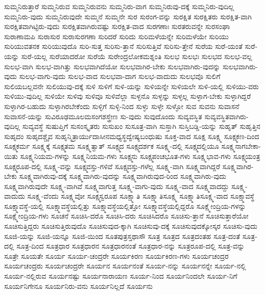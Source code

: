 {ಸುಮ್ಮನಿರುತ್ತಾರೆ
ಸುಮ್ಮನಿರುವ
ಸುಮ್ಮನಿರುವನು
ಸುಮ್ಮನಿರು-ವಾಗ
ಸುಮ್ಮನಿರುವು-ದಕ್ಕೆ
ಸುಮ್ಮನಿರು-ವುದಿಲ್ಲ
ಸುಮ್ಮನಿರು-ವುದು
ಸುಮ್ಮನಿರುವುದೇ
ಸುಮ್ಮನೆ
ಸುಮ್ಮನೇ
ಸುರ
ಸುರಂಗ-ವನ್ನು
ಸುರಕ್ಷಿತ
ಸುರಕ್ಷಿತರು
ಸುರಕ್ಷಿತ-ವಾಗಿ
ಸುರಕ್ಷಿತವಾಗಿಟ್ಟಿರು-ವುದು
ಸುರಕ್ಷಿತವಾಗಿರುವಷ್ಟು
ಸುರಕ್ಷಿತ-ವಾದ
ಸುರಗಣಾಃ
ಸುರತರುವನ್ನೇ
ಸುರಸಂಘಾ
ಸುರಾಣಾಮಪಿ
ಸುರಾಸುರ
ಸುರಾಸುರಗಣಾ
ಸುರಿದರೆ
ಸುರಿದು
ಸುರಿಮಳೆಯನ್ನೇ
ಸುರಿಮಳೆಯೇ
ಸುರಿಯು
ಸುರಿಯುವತನಕ
ಸುರಿಯುವುದೊ
ಸುರಿ-ಸುತ್ತ
ಸುರಿಸು-ತ್ತಾನೆ
ಸುರಿಸುತ್ತಿವೆ
ಸುರಿಸು-ತ್ತೇನೆ
ಸುರೆಯ
ಸುರೆ-ಯಂತೆ
ಸುರೆ-ಯನ್ನು
ಸುರೆ-ಯಲ್ಲ
ಸುರೆಯಾದರೋ
ಸುರೆಯೆ
ಸುರೇಂದ್ರಲೋಕಮಶ್ನಂತಿ
ಸುಲಭ
ಸುಲಭಃ
ಸುಲಭದ
ಸುಲಭ-ವಲ್ಲ
ಸುಲಭ-ವಾಗಿ
ಸುಲಭ-ವಾಗಿತ್ತು
ಸುಲಭವಾಗಿದೆಯೋ
ಸುಲಭವಾಗಿರ-ಬೇಕು
ಸುಲಭವಾಗಿರು-ವುದನ್ನು
ಸುಲಭವಾಗಿರು-ವುದು
ಸುಲಭ-ವಾಗು-ವುದು
ಸುಲಭ-ವಾದ
ಸುಲಭವಾ-ದಾಗ
ಸುಲಭ-ವಾದುದು
ಸುಲಭವೊ
ಸುಲಿಗೆ
ಸುಲಿಯಬಲ್ಲವನೇ
ಸುಲಿಯುವು-ದಕ್ಕೆ
ಸುಳಿ
ಸುಳಿಗೆ
ಸುಳಿ-ಯನ್ನು
ಸುಳಿಯನ್ನೇ
ಸುಳಿಯಲೇ
ಸುಳಿ-ಯಲ್ಲಿ
ಸುಳಿಯು-ವರು
ಸುಳಿಯು-ವುದಿಲ್ಲ
ಸುಳಿಯೇ
ಸುಳಿವು
ಸುಳಿವೂ
ಸುಳಿವೆಲ್ಲಾ
ಸುಳ್ಳನೊ
ಸುಳ್ಳನ್ನು
ಸುಳ್ಳಲ್ಲ
ಸುಳ್ಳಾಗ-ಬೇಕು
ಸುಳ್ಳಾಗಿದ್ದರೆ
ಸುಳ್ಳಾಗಿರ-ಬಹುದು
ಸುಳ್ಳಾಗಿರಬೇಕೆಂದು
ಸುಳ್ಳಿಗೆ
ಸುಳ್ಳಿ-ನಿಂದ
ಸುಳ್ಳು
ಸುಳ್ಳೇ
ಸುಳ್ಳೋ
ಸುವ
ಸುವನು
ಸುವಾಸನೆ
ಸುವಾಸನೆ-ಯನ್ನು
ಸುವಿರೂಢಮೂಲಮಸಂಗಶಸ್ತ್ರೇಣ
ಸು-ವುದು
ಸುವುದೊಂದು
ಸುವ್ಯವಸ್ಥಿತ
ಸುವ್ಯವಸ್ಥಿತವಾಗಿರು-ವುದಿಲ್ಲ
ಸುವ್ಯವಸ್ಥೆ
ಸುಷುಪ್ತಿಗೆ
ಸುಸಂಸ್ಕೃತರು
ಸುಸುಖಂ
ಸುಸೂತ್ರ-ವಾಗಿ
ಸುಸ್ತಾಗಿ
ಸುಸ್ತಿಬಡ್ಡಿ-ಯನ್ನು
ಸುಹೃತ್
ಸುಹೃತ್ತಿನ
ಸುಹೃದಂ
ಸುಹೃದಶ್ಚೈವ
ಸುಹೃನ್ಮಿತ್ರಾರ್ಯುದಾಸೀನಮಧ್ಯಸ್ಥದ್ವೇಷ್ಯಬಂಧುಷು
ಸೂಕ್ತ-ವಾದ
ಸೂಕ್ಷ
ಸೂಕ್ಷ್ಮ
ಸೂಕ್ಷ್ಮಕಣ-ದಿಂದ
ಸೂಕ್ಷ್ಮಕರ್ಮ
ಸೂಕ್ಷ್ಮಕ್ಕೆ
ಸೂಕ್ಷ್ಮತಮ
ಸೂಕ್ಷ್ಮತ್ವಾತ್
ಸೂಕ್ಷ್ಮದ
ಸೂಕ್ಷ್ಮದರ್ಶಕ
ಸೂಕ್ಷ್ಮ-ದಲ್ಲಿ
ಸೂಕ್ಷ್ಮದಲ್ಲಿಯೂ
ಸೂಕ್ಷ್ಮನಾಗಬೇಕಾ-ಯಿತು
ಸೂಕ್ಷ್ಮನಿಯಮ-ಗಳನ್ನು
ಸೂಕ್ಷ್ಮನಿಯಮ-ಗಳು
ಸೂಕ್ಷ್ಮನು
ಸೂಕ್ಷ್ಮಪಂಚಭೂತ-ಗಳು
ಸೂಕ್ಷ್ಮಭಾವ-ಗಳು
ಸೂಕ್ಷ್ಮಯಂತ್ರ
ಸೂಕ್ಷ್ಮರೂಪ-ದಲ್ಲಿ
ಸೂಕ್ಷ್ಮ-ವನ್ನು
ಸೂಕ್ಷ್ಮವಸ್ತು-ಗಳಿವೆ
ಸೂಕ್ಷ್ಮವಸ್ತು-ಗಳೆಲ್ಲ
ಸೂಕ್ಷ್ಮ-ವಾಗಿ
ಸೂಕ್ಷ್ಮವಾಗಿದ್ದರೆ
ಸೂಕ್ಷ್ಮವಾಗಿರ-ಬೇಕು
ಸೂಕ್ಷ್ಮವಾಗಿರುವು-ದಕ್ಕೆ
ಸೂಕ್ಷ್ಮವಾಗಿರು-ವುದನ್ನು
ಸೂಕ್ಷ್ಮವಾಗಿರುವುದ-ರಿಂದ
ಸೂಕ್ಷ್ಮವಾಗಿರು-ವುದು
ಸೂಕ್ಷ್ಮವಾಗಿರುವುದೇ
ಸೂಕ್ಷ್ಮ-ವಾಗಿವೆ
ಸೂಕ್ಷ್ಮವಾಗುತ್ತ
ಸೂಕ್ಷ್ಮ-ವಾಗು-ವುದು
ಸೂಕ್ಷ್ಮ-ವಾದ
ಸೂಕ್ಷ್ಮವಾದದ್ದು
ಸೂಕ್ಷ್ಮ-ವಾದುದು
ಸೂಕ್ಷ್ಮ-ವೆಂದು
ಸೂಕ್ಷ್ಮವೋ
ಸೂಕ್ಷ್ಮಸ್ವರೂಪ
ಸೂಕ್ಷ್ಮಾತಿ
ಸೂಕ್ಷ್ಮಾತಿಸೂಕ್ಷ್ಮ
ಸೂಕ್ಷ್ಮಾತಿಸೂಕ್ಷ್ಮ-ವಾದ
ಸೂಕ್ಷ್ಮಾವಸ್ಥೆ
ಸೂಕ್ಷ್ಮಾವಸ್ಥೆ-ಯಲ್ಲಿ
ಸೂಕ್ಷ್ಮಾವಸ್ಥೆಯಲ್ಲಿತ್ತು
ಸೂಕ್ಷ್ಮಾವಸ್ಥೆಯಲ್ಲಿತ್ತೋ
ಸೂಕ್ಷ್ಮಾವಸ್ಥೆಯಲ್ಲಿದ್ದರೊ
ಸೂಕ್ಷ್ಮೇಂದ್ರಿಯ-ಗಳನ್ನು
ಸೂಕ್ಷ್ಮೇಂದ್ರಿಯ-ಗಳು
ಸೂಚನೆ
ಸೂಚಿಸಿ-ದರೊ
ಸೂಚಿಸಿ-ದರು
ಸೂಚಿಸಿದರೊ
ಸೂಚಿಸು-ತ್ತಾನೆ
ಸೂಚಿಸುತ್ತಾರೆಯೋ
ಸೂಚಿಸುತ್ತಿದ್ದರು
ಸೂಚಿಸುತ್ತಿರುವುದೊ
ಸೂಚಿಸುವುದ-ಕ್ಕಾಗಿ
ಸೂಚಿಸುವು-ದಕ್ಕೆ
ಸೂಚಿಸುವುದಕ್ಕೋಸ್ಕರ
ಸೂಚಿಸು-ವುದು
ಸೂಜಿ-ಯನ್ನು
ಸೂಜಿ-ಯನ್ನೂ
ಸೂಜಿ-ಯಿಂದ
ಸೂತಪುತ್ರಸ್ತಥಾಸೌ
ಸೂತ್ರ
ಸೂತ್ರದ
ಸೂತ್ರದಂತಹ
ಸೂತ್ರ-ದಂತೆ
ಸೂತ್ರ-ದಲ್ಲಿ
ಸೂತ್ರ-ದಿಂದ
ಸೂತ್ರಧಾರ
ಸೂತ್ರಧಾರನ
ಸೂತ್ರಧಾರನಂತೆ
ಸೂತ್ರಧಾರ-ನನ್ನು
ಸೂತ್ರರೂಪ-ದಲ್ಲಿ
ಸೂತ್ರ-ವನ್ನು
ಸೂತ್ರೇ
ಸೂಯತೇ
ಸೂರ್ಯ
ಸೂರ್ಯ-ಚಂದ್ರರೇ
ಸೂರ್ಯಕಿರಣ
ಸೂರ್ಯಕಿರಣ-ಗಳು
ಸೂರ್ಯಚಂದ್ರರ
ಸೂರ್ಯಚಂದ್ರರು
ಸೂರ್ಯಚಂದ್ರರೇ
ಸೂರ್ಯನ
ಸೂರ್ಯನಂತೆ
ಸೂರ್ಯ-ನನ್ನು
ಸೂರ್ಯನನ್ನೇ
ಸೂರ್ಯ-ನಲ್ಲಿ
ಸೂರ್ಯ-ನಲ್ಲಿರುವ
ಸೂರ್ಯನಷ್ಟು
ಸೂರ್ಯನಾರಾಯಣ
ಸೂರ್ಯ-ನಿಂದ
ಸೂರ್ಯನಿಂದಲೇ
ಸೂರ್ಯ-ನಿಗೆ
ಸೂರ್ಯನಿಗೇನೂ
ಸೂರ್ಯನಿರು-ವನು
ಸೂರ್ಯನಿಲ್ಲದೆ
ಸೂರ್ಯನು
}
